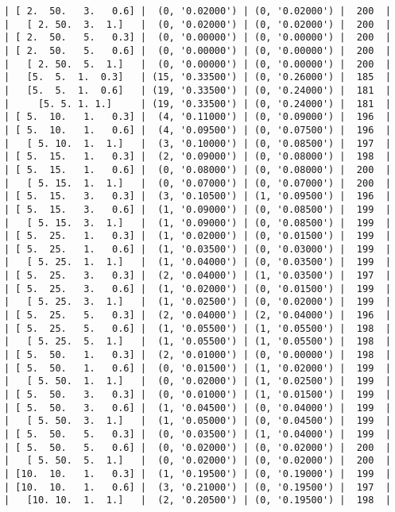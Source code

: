 \documentclass{article}
\begin{document}
\begin{verbatim}
| [ 2.  50.   3.   0.6] |  (0, '0.02000') | (0, '0.02000') |  200  |
|   [ 2. 50.  3.  1.]   |  (0, '0.02000') | (0, '0.02000') |  200  |
| [ 2.  50.   5.   0.3] |  (0, '0.00000') | (0, '0.00000') |  200  |
| [ 2.  50.   5.   0.6] |  (0, '0.00000') | (0, '0.00000') |  200  |
|   [ 2. 50.  5.  1.]   |  (0, '0.00000') | (0, '0.00000') |  200  |
|   [5.  5.  1.  0.3]   | (15, '0.33500') | (0, '0.26000') |  185  |
|   [5.  5.  1.  0.6]   | (19, '0.33500') | (0, '0.24000') |  181  |
|     [5. 5. 1. 1.]     | (19, '0.33500') | (0, '0.24000') |  181  |
| [ 5.  10.   1.   0.3] |  (4, '0.11000') | (0, '0.09000') |  196  |
| [ 5.  10.   1.   0.6] |  (4, '0.09500') | (0, '0.07500') |  196  |
|   [ 5. 10.  1.  1.]   |  (3, '0.10000') | (0, '0.08500') |  197  |
| [ 5.  15.   1.   0.3] |  (2, '0.09000') | (0, '0.08000') |  198  |
| [ 5.  15.   1.   0.6] |  (0, '0.08000') | (0, '0.08000') |  200  |
|   [ 5. 15.  1.  1.]   |  (0, '0.07000') | (0, '0.07000') |  200  |
| [ 5.  15.   3.   0.3] |  (3, '0.10500') | (1, '0.09500') |  196  |
| [ 5.  15.   3.   0.6] |  (1, '0.09000') | (0, '0.08500') |  199  |
|   [ 5. 15.  3.  1.]   |  (1, '0.09000') | (0, '0.08500') |  199  |
| [ 5.  25.   1.   0.3] |  (1, '0.02000') | (0, '0.01500') |  199  |
| [ 5.  25.   1.   0.6] |  (1, '0.03500') | (0, '0.03000') |  199  |
|   [ 5. 25.  1.  1.]   |  (1, '0.04000') | (0, '0.03500') |  199  |
| [ 5.  25.   3.   0.3] |  (2, '0.04000') | (1, '0.03500') |  197  |
| [ 5.  25.   3.   0.6] |  (1, '0.02000') | (0, '0.01500') |  199  |
|   [ 5. 25.  3.  1.]   |  (1, '0.02500') | (0, '0.02000') |  199  |
| [ 5.  25.   5.   0.3] |  (2, '0.04000') | (2, '0.04000') |  196  |
| [ 5.  25.   5.   0.6] |  (1, '0.05500') | (1, '0.05500') |  198  |
|   [ 5. 25.  5.  1.]   |  (1, '0.05500') | (1, '0.05500') |  198  |
| [ 5.  50.   1.   0.3] |  (2, '0.01000') | (0, '0.00000') |  198  |
| [ 5.  50.   1.   0.6] |  (0, '0.01500') | (1, '0.02000') |  199  |
|   [ 5. 50.  1.  1.]   |  (0, '0.02000') | (1, '0.02500') |  199  |
| [ 5.  50.   3.   0.3] |  (0, '0.01000') | (1, '0.01500') |  199  |
| [ 5.  50.   3.   0.6] |  (1, '0.04500') | (0, '0.04000') |  199  |
|   [ 5. 50.  3.  1.]   |  (1, '0.05000') | (0, '0.04500') |  199  |
| [ 5.  50.   5.   0.3] |  (0, '0.03500') | (1, '0.04000') |  199  |
| [ 5.  50.   5.   0.6] |  (0, '0.02000') | (0, '0.02000') |  200  |
|   [ 5. 50.  5.  1.]   |  (0, '0.02000') | (0, '0.02000') |  200  |
| [10.  10.   1.   0.3] |  (1, '0.19500') | (0, '0.19000') |  199  |
| [10.  10.   1.   0.6] |  (3, '0.21000') | (0, '0.19500') |  197  |
|   [10. 10.  1.  1.]   |  (2, '0.20500') | (0, '0.19500') |  198  |

\end{verbatim}
\end{document}
